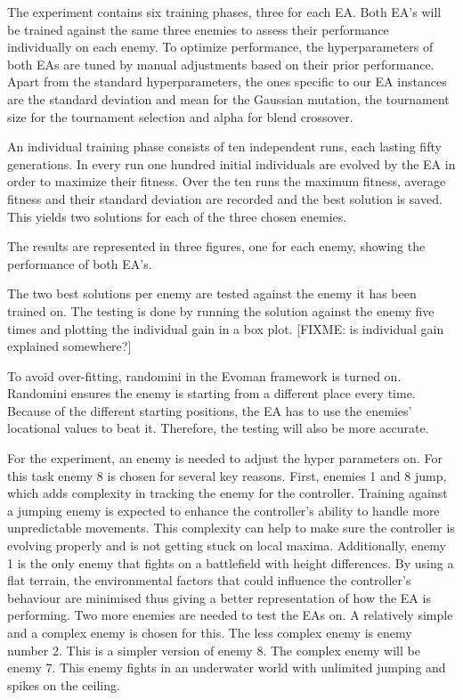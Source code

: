 The experiment contains six training phases, three for each EA.
Both EA’s will be trained against the same three enemies to assess their performance individually on each enemy.
To optimize performance, the hyperparameters of both EAs are tuned by manual adjustments based on their prior performance.
Apart from the standard hyperparameters, the ones specific to our EA instances are the standard deviation and mean for the Gaussian mutation, the tournament size for the tournament selection and alpha for blend crossover.

An individual training phase consists of ten independent runs, each lasting fifty generations.
In every run one hundred initial individuals are evolved by the EA in order to maximize their fitness.
Over the ten runs the maximum fitness, average fitness and their standard deviation are recorded and the best solution is saved.
This yields two solutions for each of the three chosen enemies.

The results are represented in three figures, one for each enemy, showing the performance of both EA’s.

The two best solutions per enemy are tested against the enemy it has been trained on.
The testing is done by running the solution against the enemy five times and plotting the individual gain in a box plot.
[FIXME: is individual gain explained somewhere?]

To avoid over-fitting, randomini in the Evoman framework is turned on.
Randomini ensures the enemy is starting from a different place every time.
Because of the different starting positions, the EA has to use the enemies’ locational values to beat it.
Therefore, the testing will also be more accurate.

For the experiment, an enemy is needed to adjust the hyper parameters on.
For this task enemy 8 is chosen for several key reasons. First, enemies 1 and 8 jump, which adds complexity in tracking the enemy for the controller.
Training against a jumping enemy is expected to enhance the controller’s ability to handle more unpredictable movements.
This complexity can help to make sure the controller is evolving properly and is not getting stuck on local maxima.
Additionally, enemy 1 is the only enemy that fights on a battlefield with height differences.
By using a flat terrain, the environmental factors that could influence the controller’s behaviour are minimised thus giving a better representation of how the EA is performing.
Two more enemies are needed to test the EAs on. A relatively simple and a complex enemy is chosen for this.
The less complex enemy is enemy number 2.
This is a simpler version of enemy 8.
The complex enemy will be enemy 7.
This enemy fights in an underwater world with unlimited jumping and spikes on the ceiling.

